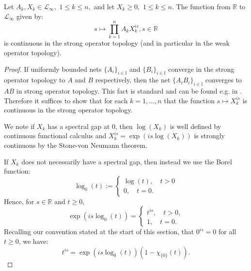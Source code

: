     \begin{lem}\label{measurability lemma} 
        Let $A_k,X_k\in\mathcal{L}_{\infty},$ $1\leq k\leq n,$ and let $X_k\geq0,$ $1\leq k\leq n.$ The function from $\mathbb{R}$ to $\mathcal{L}_\infty$ given by:
        \begin{equation*}
            s\mapsto \prod_{k=1}^nA_kX_k^{is}, s \in \mathbb{R}
        \end{equation*}
        is continuous in the strong operator topology (and in particular in the weak operator topology).
    \end{lem}
    \begin{proof}
        If uniformly bounded nets $\{A_i\}_{i\in\mathbb{I}}$ and $\{B_i\}_{i\in\mathbb{I}}$ converge in the strong operator topology to $A$ and $B$ respectively, then the net $\{A_iB_i\}_{i\in\mathbb{I}}$ converges to $AB$ in strong operator topology. This fact is standard and can be found e.g. in \cite[Proposition 2.4.1]{Bratteli-Robinson1}. Therefore it suffices to show that for each $k = 1,\ldots,n$ that the function $s\mapsto X_k^{is}$
        is continuous in the strong operator topology.        
        
        We note if $X_k$ has a spectral gap at $0$, then $\log(X_k)$ is well defined by continuous functional calculus and $X_k^{is} = \exp(is\log(X_k))$
        is strongly continuous by the Stone-von Neumann theorem. 
        
        If $X_k$ does not necessarily have a spectral gap, then instead we use the Borel function:
        \begin{equation*}
            \log_0(t) := \begin{cases}
                            \log(t),\quad t > 0\\
                            0,\quad t = 0.
                         \end{cases}
        \end{equation*}
        Hence, for $s \in \mathbb{R}$ and $t \geq 0$,
        \begin{equation*}
            \exp(is\log_0(t)) = \begin{cases}
                                    t^{is},\quad t > 0,\\
                                    1,\quad t = 0.
                                \end{cases}
        \end{equation*}
        {Recalling our convention stated at the start of this section,} that $0^{is} = 0$ for all $t \geq 0$, we have:
        \begin{equation*}
            t^{is} = \exp(is\log_0(t))(1-\chi_{\{0\}}(t)).
        \end{equation*}
        

\end{proof}

